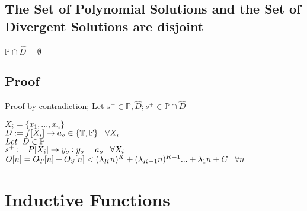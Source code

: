 \documentclass[11pt]{article}
\begin{document}




\subsection{The Set of Polynomial Solutions and the Set of Divergent Solutions are disjoint}
\begin{center}
\vspace{2mm}
$
\mathbb{P} \cap \hat{D} = \emptyset
$
\end{center}

\subsection{Proof}
Proof by contradiction; Let $s^+ \in \mathbb{P}, \hat{D}; s^+ \in \mathbb{P} \cap \hat{D}$
\begin{center}
$
X_i = \{x_1,...,x_n\}
$
\\ \vspace{2mm}
$
D := f \lbrack X_i \rbrack \rightarrow a_{o} \in \{\mathbb{T}, \mathbb{F}\} \hspace{3mm} \forall X_i
$
\\ \vspace{6mm}
$
Let \hspace{2mm} D \in \mathbb{P}
$
\\ \vspace{2mm}
$
s^+ := P \lbrack X_i \rbrack \rightarrow y_{o} : y_o = a_{o} \hspace{3mm} \forall X_i
$
\\ \vspace{2mm}
$
O[n] = O_T[n] + O_S[n] < (\lambda_K n)^K + (\lambda_{K-1} n)^{K-1}... + \lambda_1 n + C \hspace{3mm} \forall n
$
\end{center}





\newpage
\section{Inductive Functions}
\end{document}
